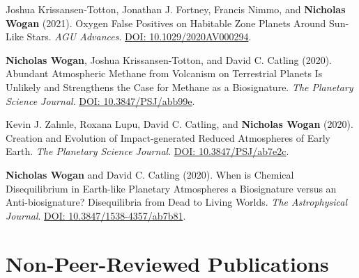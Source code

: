 \documentclass[12pt]{article}
\begin{document}
\begin{cvlist}
\item[2021]
  Joshua Krissansen-Totton, Jonathan J. Fortney, Francis Nimmo, and \textbf{Nicholas Wogan} (2021). Oxygen False Positives on Habitable Zone Planets Around Sun-Like Stars. \emph{AGU Advances}. \href{https://doi.org/10.1029/2020AV000294}{DOI: 10.1029/2020AV000294}.
\item[2020]
  \textbf{Nicholas Wogan}, Joshua Krissansen-Totton, and David C. Catling (2020). Abundant Atmospheric Methane from Volcanism on Terrestrial Planets Is Unlikely and Strengthens the Case for Methane as a Biosignature. \emph{The Planetary Science Journal}. \href{https://doi.org/10.3847/PSJ/abb99e}{DOI: 10.3847/PSJ/abb99e}.
\item[2020]
  Kevin J. Zahnle, Roxana Lupu, David C. Catling, and \textbf{Nicholas Wogan} (2020). Creation and Evolution of Impact-generated Reduced Atmospheres of Early Earth. \emph{The Planetary Science Journal}. \href{https://doi.org/10.3847/PSJ/ab7e2c}{DOI: 10.3847/PSJ/ab7e2c}.
\item[2020]
  \textbf{Nicholas Wogan} and David C. Catling (2020). When is Chemical Disequilibrium in Earth-like Planetary Atmospheres a Biosignature versus an Anti-biosignature? Disequilibria from Dead to Living Worlds. \emph{The Astrophysical Journal}. \href{https://doi.org/10.3847/1538-4357/ab7b81}{DOI: 10.3847/1538-4357/ab7b81}.
\end{cvlist}


\section{Non-Peer-Reviewed Publications}
\end{document}
